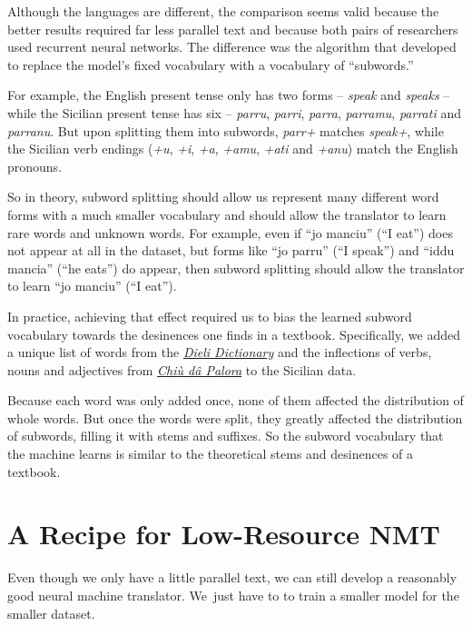 \documentclass[10pt,letterpaper]{article}
\begin{document}
Although the languages are different, the comparison seems valid because the better results required 
far less parallel text and because both pairs of researchers used recurrent neural networks.
The difference was the algorithm that \citet{sennrich2016subword}
developed to replace the model's fixed vocabulary with a vocabulary of ``subwords.''

For example, the English present tense only has two forms -- \textit{speak} and \textit{speaks} -- 
while the Sicilian present tense has six -- \textit{parru}, \textit{parri}, \textit{parra}, 
\textit{parramu}, \textit{parrati} and \textit{parranu}. 
But upon splitting them into subwords, \textit{parr+} matches \textit{speak+},
while the Sicilian verb endings
(\textit{+u}, \textit{+i}, \textit{+a}, \textit{+amu}, \textit{+ati} and \textit{+anu})
match the English pronouns.

So in theory, subword splitting should allow us represent many different word forms with a much smaller vocabulary
and should allow the translator to learn rare words and unknown words.
For example, even if ``jo manciu'' (``I eat'') does not appear at all in the dataset,
but forms like ``jo parru'' (``I speak'') and ``iddu mancia'' (``he eats'') do appear,
then subword splitting should allow the translator to learn ``jo manciu'' (``I eat'').

In practice, achieving that effect required us to bias the learned subword vocabulary towards
the desinences one finds in a textbook. Specifically, we added a unique list of words from the
\href{https://www.napizia.com/cgi-bin/sicilian.pl}{\textit{Dieli Dictionary}}
and the inflections of verbs, nouns and adjectives from
\href{https://www.napizia.com/cgi-bin/cchiu-da-palora.pl}{\textit{Chiù dâ Palora}}
to the Sicilian data.

Because each word was only added once, none of them affected the distribution of whole words.
But once the words were split, they greatly affected the distribution of subwords, filling it with stems and suffixes.
So the subword vocabulary that the machine learns is similar to the theoretical stems and desinences of a textbook.




\hypertarget{recipe}{}

\section{A Recipe for Low-Resource NMT}

Even though we only have a little parallel text, we can still 
develop a reasonably good neural machine translator.
We~just have to to train a smaller model for the smaller dataset.
      
\end{document}
